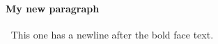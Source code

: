 \let\oldParagraph\paragraph
\renewcommand{\paragraph}[1]{\oldParagraph{#1} $~$\newline}


\paragraph{My new paragraph} This one has a newline after the bold face text.
